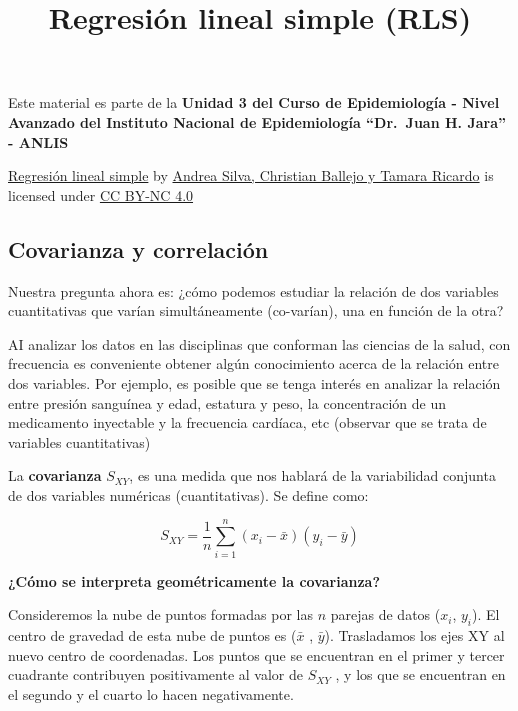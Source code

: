 \documentclass[
  letterpaper,
  DIV=11,
  numbers=noendperiod]{scrartcl}
\title{\textbf{Regresión lineal simple (RLS)}}
\author{}
\date{}
\begin{document}
\maketitle

{Este material es parte de la \textbf{Unidad 3 del Curso de
Epidemiología - Nivel Avanzado del Instituto Nacional de Epidemiología
``Dr.~Juan H. Jara'' - ANLIS}}

{\href{https://datos-ine.github.io/EpiAvanzada/unidad_3/rls/}{Regresión
lineal simple} by \hyperref[0]{Andrea Silva, Christian Ballejo y Tamara
Ricardo} is licensed under \hyperref[0]{CC BY-NC 4.0} }

\subsection{Covarianza y correlación}\label{covarianza-y-correlaciuxf3n}

Nuestra pregunta ahora es: ¿cómo podemos estudiar la relación de dos
variables cuantitativas que varían simultáneamente (co-varían), una en
función de la otra?

AI analizar los datos en las disciplinas que conforman las ciencias de
la salud, con frecuencia es conveniente obtener algún conocimiento
acerca de la relación entre dos variables. Por ejemplo, es posible que
se tenga interés en analizar la relación entre presión sanguínea y edad,
estatura y peso, la concentración de un medicamento inyectable y la
frecuencia cardíaca, etc (observar que se trata de variables
cuantitativas)

La \textbf{covarianza} \(S_{XY}\), es una medida que nos hablará de la
variabilidad conjunta de dos variables numéricas (cuantitativas). Se
define como:

\[S_{XY} = \frac{1}{n} \sum_{i=1}^{n} (x_i - \bar{x})(y_i - \bar{y})  \]

\textbf{¿Cómo se interpreta geométricamente la covarianza?}

Consideremos la nube de puntos formadas por las \(n\) parejas de datos
(\(x_i\), \(y_i\)). El centro de gravedad de esta nube de puntos es
(\(\bar{x}\) , \(\bar{y}\)). Trasladamos los ejes XY al nuevo centro de
coordenadas. Los puntos que se encuentran en el primer y tercer
cuadrante contribuyen positivamente al valor de \(S_{XY}\) , y los que
se encuentran en el segundo y el cuarto lo hacen negativamente.
\end{document}
